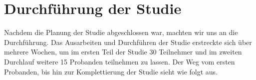 \chapter{Durchführung der Studie}

Nachdem die Planung der Studie abgeschlossen war, machten wir uns an die Durchführung. Das Ausarbeiten und Durchführen der Studie erstreckte sich über mehrere Wochen, um im ersten Teil der Studie 30 Teilnehmer und im zweiten Durchlauf weitere 15 Probanden teilnehmen zu lassen. Der Weg vom ersten Probanden, bis hin zur Komplettierung der Studie sieht wie folgt aus.

